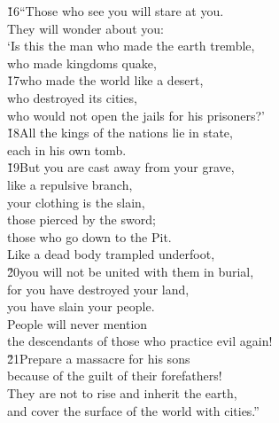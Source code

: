 \begin{poetry}
\poeml \v{16}``Those who see you will stare at you. \\
\poemll    They will wonder about you: \\
\poeml `Is this the man who made the earth tremble, \\
\poemll    who made kingdoms quake, \\
\poeml \v{17}who made the world like a desert, \\
\poemll    who destroyed its cities, \\
\poemlll       who would not open the jails for his prisoners?' \\
\poeml \v{18}All the kings of the nations lie in state, \\
\poemll    each in his own tomb. \\
\poeml \v{19}But you are cast away from your grave, \\
\poemll    like a repulsive branch, \\
\poeml your clothing is the slain, \\
\poemll    those pierced by the sword; \\
\poemlll       those who go down to the Pit. \\
\poeml Like a dead body trampled underfoot, \\
\poeml \v{20}you will not be united with them in burial, \\
\poeml for you have destroyed your land, \\
\poemll    you have slain your people. \\
\poeml People will never mention \\
\poemll    the descendants of those who practice evil again! \\
\poeml \v{21}Prepare a massacre for his sons \\
\poemll    because of the guilt of their forefathers! \\
\poeml They are not to rise and inherit the earth, \\
\poemll    and cover the surface of the world with cities.''
\end{poetry}

